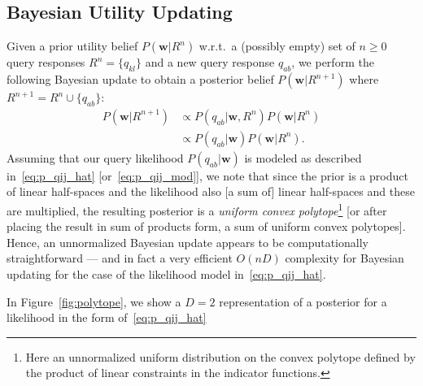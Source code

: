 \documentclass{article} %
\renewcommand{\vec}[1]{\mathbf{#1}}
\begin{document}
\subsection{Bayesian Utility Updating}

\label{sec:pe_model_infer}

Given a prior utility belief $P(\vec{w}|R^n)$ w.r.t.\ a
(possibly empty) set of $n \geq 0$ query responses $R^n = \{ q_{kl}
\}$ and a new query response $q_{ab}$, we perform the following
Bayesian update to obtain a posterior belief $P(\vec{w}|R^{n+1})$
where $R^{n+1} = R^n \cup \{ q_{ab} \}$:
\begin{align}
P(\vec{w}|R^{n+1}) & \propto P(q_{ab}|\vec{w},R^n) P(\vec{w}|R^n) \nonumber \\
                   & \propto P(q_{ab}|\vec{w}) P(\vec{w}|R^n). \label{eq:bayes_update}
\end{align}
Assuming that our query likelihood $P(q_{ab}|\vec{w})$ is modeled as
described in~\eqref{eq:p_qij_hat} [or~\eqref{eq:p_qij_mod}], we note
that since the prior is a product of linear half-spaces and the
likelihood also [a sum of] linear half-spaces and these are
multiplied, the resulting posterior is a \emph{uniform convex
polytope}\footnote{Here an unnormalized uniform distribution on the
convex polytope defined by the product of linear constraints in the
indicator functions.} [or after placing the result in sum of products
form, a sum of uniform convex polytopes].  Hence, an unnormalized
Bayesian update appears to be computationally straightforward --- 
and in fact a 
very efficient $O(nD)$ complexity for Bayesian updating 
for the case of the likelihood model in~\eqref{eq:p_qij_hat}.

In Figure~\ref{fig:polytope}, we show a $D=2$ representation of a
posterior for a likelihood in the form of~\eqref{eq:p_qij_hat}
\end{document}
